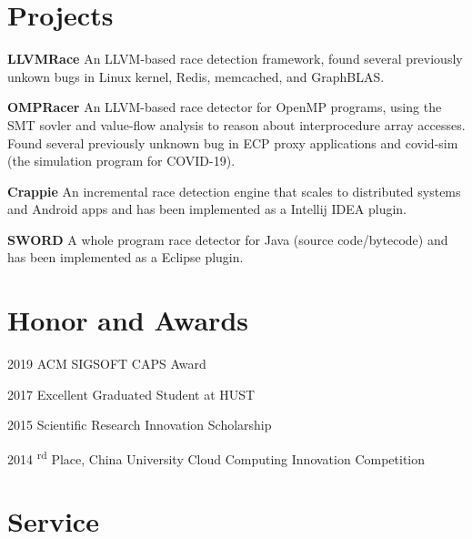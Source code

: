 \documentclass[12pt,letterpaper]{report}
\newcommand{\listtabwidth}{1.75cm}
\begin{document}
	\section*{Projects}
	
	\begin{tablist}
		\item[\textbf{LLVMRace}]
		\tab An LLVM-based race detection framework, found several previously unkown bugs in Linux kernel, Redis, memcached, and GraphBLAS.
		\item[\textbf{OMPRacer}] 
		\tab An LLVM-based race detector for OpenMP programs, 
		using the SMT sovler and value-flow analysis to reason about interprocedure array accesses.\\
		Found several previously unknown bug in ECP proxy applications and covid-sim (the simulation program for COVID-19).
		\item[\textbf{Crappie}] 
		\tab An incremental race detection engine that scales to distributed systems and Android apps and has been implemented as a Intellij IDEA plugin.
		\item[\textbf{SWORD}] 
		\tab A whole program race detector for Java (source code/bytecode) and has been implemented as a Eclipse plugin.
	\end{tablist}
\renewcommand{\listtabwidth}{1.75cm}


\section*{Honor and Awards}

\begin{tablist}
	\item[2019] \tab ACM SIGSOFT CAPS Award
	\item[2017] \tab Excellent Graduated Student at HUST
	\item[2015] \tab Scientific Research Innovation Scholarship
	\item[2014] \textsuperscript{rd} Place, China University Cloud Computing Innovation Competition
\end{tablist}


	
	\section*{Service}
	
\end{document}
